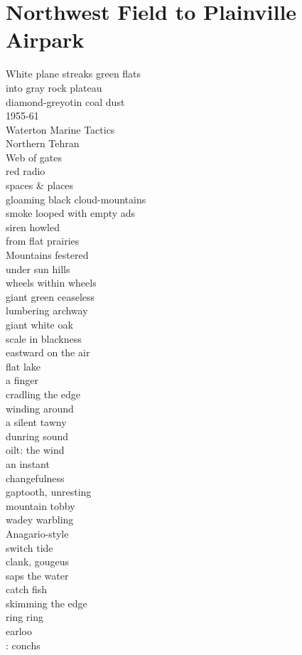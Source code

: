 \documentclass[smalldemyvopaper,11pt,twoside,onecolumn,openright,extrafontsizes]{memoir}
\begin{document}
\chapter{Northwest Field to Plainville Airpark}
White plane streaks green flats
\\into gray rock plateau
\\diamond-greyotin coal dust
\\1955-61
\\Waterton Marine Tactics
\\Northern Tehran
\\Web of gates
\\red radio
\\spaces \& places
\\gloaming black cloud-mountains
\\smoke looped with empty ads
\\siren howled
\\from flat prairies
\\Mountains festered
\\under sun hills
\\wheels within wheels
\\giant green ceaseless
\\lumbering archway
\\giant white oak
\\scale in blackness
\\eastward on the air
\\flat lake
\\a finger
\\cradling the edge
\\winding around
\\a silent tawny
\\dunring sound
\\oilt: the wind
\\an instant
\\changefulness
\\gaptooth, unresting
\\mountain tobby
\\wadey warbling
\\Anagario-style
\\switch tide
\\clank, gougeus
\\saps the water
\\catch fish
\\skimming the edge
\\ring ring
\\earloo
\\: conchs
\end{document}
